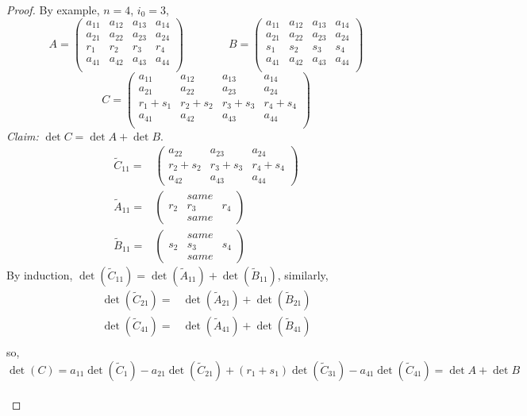 \documentclass[12pt]{article}
\begin{document}
\begin{proof}
	By example, $n = 4$, $i_0 = 3$, 
	\[
		A = 
		\begin{pmatrix}
			a_{11} & a_{12} & a_{13} & a_{14}	\\
			a_{21} & a_{22} & a_{23} & a_{24}	\\
			r_1	   & r_2    & r_3    & r_4		\\
			a_{41} & a_{42} & a_{43} & a_{44}	\\
		\end{pmatrix}
	\qquad 
	\qquad 
		B = 
		\begin{pmatrix}
			a_{11} & a_{12} & a_{13} & a_{14}	\\
			a_{21} & a_{22} & a_{23} & a_{24}	\\
			s_1	   & s_2    & s_3    & s_4		\\
			a_{41} & a_{42} & a_{43} & a_{44}	\\
		\end{pmatrix}
	\]
	\[
		C = 
		\begin{pmatrix}
			a_{11} & a_{12} & a_{13} & a_{14}	\\
			a_{21} & a_{22} & a_{23} & a_{24}	\\
			r_1+s_1& r_2+s_2& r_3+s_3& r_4+s_4	\\
			a_{41} & a_{42} & a_{43} & a_{44}	\\
		\end{pmatrix}
	\]
	\textit{Claim:} $\det C = \det A + \det B$. 
	\begin{align*}
		\tilde C_{11} =&
		\begin{pmatrix}
			a_{22}	& a_{23}	& a_{24}	\\
			r_2+s_2	& r_3+s_3	& r_4+s_4	\\
			a_{42}	& a_{43}	& a_{44}
		\end{pmatrix}	\\
		\tilde A_{11} =&
		\begin{pmatrix}
				& same &	\\
			r_2 & r_3  & r_4\\
				& same &
		\end{pmatrix}	\\
		\tilde B_{11} =&
		\begin{pmatrix}
				& same &	\\
			s_2 & s_3  & s_4\\
				& same &
		\end{pmatrix}	
	\end{align*}
	By induction, 
	$\det(\tilde C_{11}) = \det(\tilde A_{11}) + \det (\tilde B_{11})$, 
	similarly, 
	\begin{align*}
		\det(\tilde C_{21}) =& \det(\tilde A_{21}) + \det (\tilde B_{21})	\\
		\det(\tilde C_{41}) =& \det(\tilde A_{41}) + \det (\tilde B_{41})	\\
	\end{align*}
	so, 
	\[
		\det(C) = a_{11} \det (\tilde C_1) - a_{21} \det(\tilde C_{21})
		+ (r_1 + s_1) \det(\tilde C_{31}) - a_{41} \det(\tilde C_{41})
		= \det A + \det B
	\]	\\
	
\end{proof}
\end{document}
